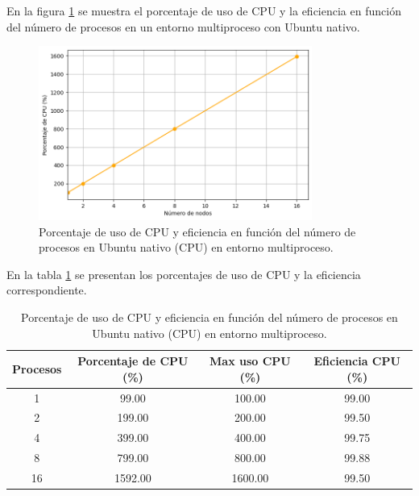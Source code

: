 En la figura \ref{fig:multi-node_ubuntu_cpu_native_cpu} se muestra el porcentaje de uso de CPU y la eficiencia en función del número de procesos en un entorno multiproceso con Ubuntu nativo.

\begin{figure}[H]
    \centering
    \includegraphics[width=0.8\textwidth]{imagenes/cap5/multi-node_ubuntu_cpu_native_cpu_time.png}
    \caption{Porcentaje de uso de CPU y eficiencia en función del número de procesos en Ubuntu nativo (CPU) en entorno multiproceso.}
    \label{fig:multi-node_ubuntu_cpu_native_cpu}
\end{figure}

En la tabla \ref{tab:multi-node_ubuntu_cpu_native_cpu} se presentan los porcentajes de uso de CPU y la eficiencia correspondiente.

\begin{table}[ht]
    \centering
    \small
    \setlength{\tabcolsep}{4pt}
    \renewcommand{\arraystretch}{1.1}
    \begin{tabular}{|c|c|c|c|}
        \hline
        \textbf{Procesos} & \textbf{Porcentaje de CPU (\%)} & \textbf{Max uso CPU (\%)} & \textbf{Eficiencia CPU (\%)} \\
        \hline
        1                 & 99.00                           & 100.00                    & 99.00                        \\
        2                 & 199.00                          & 200.00                    & 99.50                        \\
        4                 & 399.00                          & 400.00                    & 99.75                        \\
        8                 & 799.00                          & 800.00                    & 99.88                        \\
        16                & 1592.00                         & 1600.00                   & 99.50                        \\
        \hline
    \end{tabular}
    \caption{Porcentaje de uso de CPU y eficiencia en función del número de procesos en Ubuntu nativo (CPU) en entorno multiproceso.}
    \label{tab:multi-node_ubuntu_cpu_native_cpu}
\end{table}

